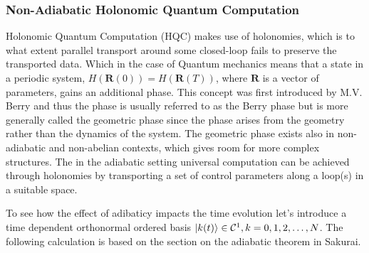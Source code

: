 \subsubsection{Non-Adiabatic Holonomic Quantum Computation}
Holonomic Quantum Computation (HQC) makes use of holonomies, which is to what extent parallel transport around some closed-loop fails to preserve the transported data. Which in the case of Quantum mechanics means that a state in a periodic system, $H(\mathbf{R}(0)) = H(\mathbf{R}(T))$, where $\mathbf{R}$ is a vector of parameters, gains an additional phase. This concept was first introduced by M.V. Berry\cite{berry} and thus the phase is usually referred to as the Berry phase but is more generally called the geometric phase since the phase arises from the geometry rather than the dynamics of the system. The geometric phase exists also in non-adiabatic and non-abelian contexts, which gives room for more complex structures\cite{anandan1, anandan2, zee}. 
The in the adiabatic setting universal computation can be achieved through holonomies by transporting a set of control parameters along a loop(s) in a suitable space\cite{HQC}.

To see how the effect of adibaticy impacts the time evolution let's introduce a time dependent orthonormal ordered basis $\ket{k(t)} \in \mathcal{C}^1, k = 0,1,2,\dots,N$. The following calculation is based on the section on the adiabatic theorem in Sakurai\cite{Sakurai}.

